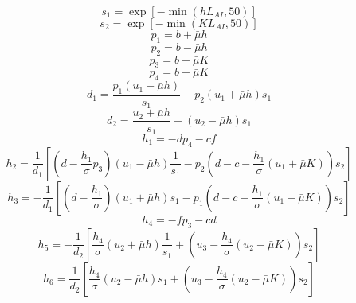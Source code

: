 \begin{equation}
s_{1}=\exp \left[-\min \left(h L_{AI}, 50\right)\right]
\end{equation}
\begin{equation}
s_{2}=\exp \left[-\min \left(K L_{AI}, 50\right)\right]
\end{equation}
\begin{equation}
p_{1}=b+\bar{\mu} h
\end{equation}
\begin{equation}
p_{2}=b-\bar{\mu} h
\end{equation}
\begin{equation}
p_{3}=b+\bar{\mu} K
\end{equation}
\begin{equation}
p_{4}=b-\bar{\mu} K
\end{equation}
\begin{equation}
d_{1}=\frac{p_{1}\left(u_{1}-\bar{\mu} h\right)}{s_{1}}-p_{2}\left(u_{1}+\bar{\mu} h\right) s_{1}
\end{equation}
\begin{equation}
d_{2}=\frac{u_{2}+\bar{\mu} h}{s_{1}}-\left(u_{2}-\bar{\mu} h\right) s_{1}
\end{equation}
\begin{equation}
h_{1}=-d p_{4}-c f
\end{equation}
\begin{equation}
h_{2}=\frac{1}{d_{1}}\left[\left(d-\frac{h_{1}}{\sigma} p_{3}\right)\left(u_{1}-\bar{\mu} h\right) 
\frac{1}{s_{1}}-p_{2}\left(d-c-\frac{h_{1}}{\sigma}\left(u_{1}+\bar{\mu} K\right)\right) s_{2}\right]
\end{equation}
\begin{equation}
h_{3}=-\frac{1}{d_{1}}\left[\left(d-\frac{h_{1}}{\sigma}\right)\left(u_{1}+\bar{\mu} h\right) 
s_{1}-p_{1}\left(d-c-\frac{h_{1}}{\sigma}\left(u_{1}+\bar{\mu} K\right)\right) s_{2}\right]
\end{equation}
\begin{equation}
h_{4}=-f p_{3}-c d
\end{equation}
\begin{equation}
h_{5}=-\frac{1}{d_{2}}\left[\frac{h_{4}}{\sigma}\left(u_{2}+\bar{\mu} h\right) 
\frac{1}{s_{1}}+\left(u_{3}-\frac{h_{4}}{\sigma}\left(u_{2}-\bar{\mu} K\right)\right) s_{2}\right]
\end{equation}
\begin{equation}
h_{6}=\frac{1}{d_{2}}\left[\frac{h_{4}}{\sigma}\left(u_{2}-\bar{\mu} h\right) 
s_{1}+\left(u_{3}-\frac{h_{4}}{\sigma}\left(u_{2}-\bar{\mu} K\right)\right) s_{2}\right]
\end{equation}
